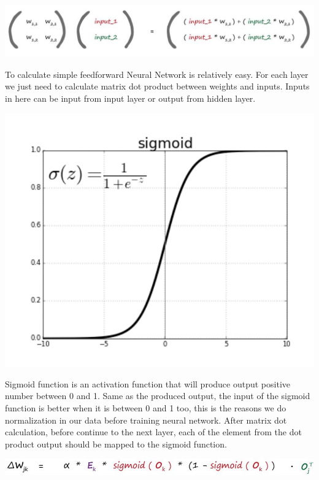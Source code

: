 \documentclass[a4paper, 12pt]{article}
\begin{document}
\begin{multicols}{2}
\centering
\vspace{0.2cm}
\includegraphics[scale=0.155]{nn_matrix}
\vspace{0.2cm}

\justifying
  To calculate simple feedforward Neural Network is relatively easy. For each layer we just need to calculate matrix dot product between weights and inputs. Inputs in here can be input from input layer or output from hidden layer. \cite{tariq2016}

\centering
\vspace{0.2cm}
\includegraphics[scale=0.55]{sigmoid}
\vspace{0.2cm}

\justifying
  Sigmoid function is an activation function that will produce output positive number between 0 and 1. Same as the produced output, the input of the sigmoid function is better when it is between 0 and 1 too, this is the reasons we do normalization in our data before training neural network. After matrix dot calculation, before continue to the next layer, each of the element from the dot product output should be mapped to the sigmoid function. \cite{sibi2013} 

\centering
\vspace{0.2cm}
\includegraphics[scale=0.2]{delta_w}
\vspace{0.2cm}


\end{multicols}
\end{document}
